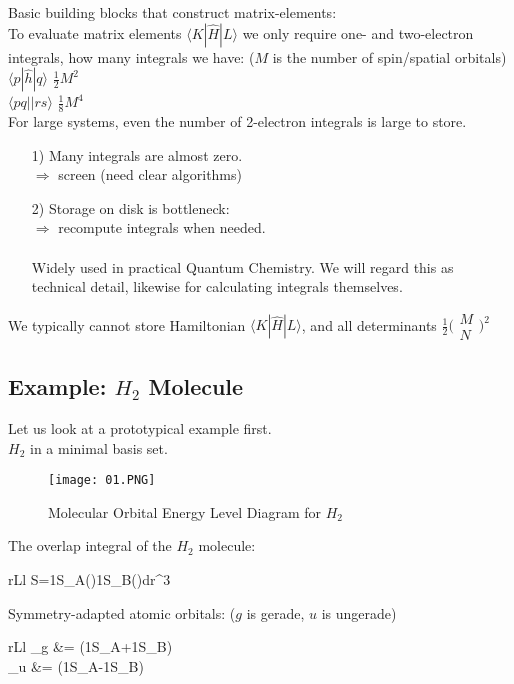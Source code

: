 \documentclass[a4paper, 12pt]{article}
\begin{document}
Basic building blocks that construct matrix-elements:\\
\tab To evaluate matrix elements $\langle K|\hat{H}|L \rangle$ we only require one- and two-electron integrals, how many integrals we have: ($M$ is the number of spin/spatial orbitals) \\
\tab\tab\tab\tab $ \langle p|\hat{h}|q \rangle$ \tab\tab\tab  $  \frac{1}{2}M^2$ \\
\tab\tab\tab\tab $ \langle pq||rs \rangle$ \tab\tab\tab $ \frac{1}{8}M^4$ \\
\tab For large systems, even the number of 2-electron integrals is large to store.
\begin{itemize}
	\item [1)] Many integrals are almost zero.\\
	$\Rightarrow$ screen (need clear algorithms)
	\item [2)]Storage on disk is bottleneck:\\
	$\Rightarrow$ recompute integrals when needed.\\
	\\
	Widely used in practical Quantum Chemistry. We will regard this as technical detail, likewise for calculating integrals themselves.
\end{itemize}



 We typically cannot store Hamiltonian $\langle K|\hat{H}|L\rangle$, and all determinants $\frac{1}{2}\bigl(\begin{smallmatrix} M \\ N\end{smallmatrix}\bigr)^2$

\subsection{Example: $H_2$ Molecule}
Let us look at a prototypical example first. \\
\tab $H_2$ in a minimal basis set.
\begin{figure}[H]
        \centering
        \texttt{[image: 01.PNG]}
        \caption{Molecular Orbital Energy Level Diagram for $H_2$}
        \label{fig:sub-first2}
\end{figure}



The overlap integral of the $H_2$ molecule: 
	 \begin{IEEEeqnarray}{rLl}
S=\int 1S_A()\cdot 1S_B()dr^3
	\end{IEEEeqnarray}
\tab Symmetry-adapted atomic orbitals: ($g$ is gerade, $u$ is ungerade)
	 \begin{IEEEeqnarray}{rLl}
\sigma_g &= (1S_A+1S_B)\cdot{} \\
\sigma_u &= (1S_A-1S_B)\cdot{} 
	\end{IEEEeqnarray}
\end{document}
